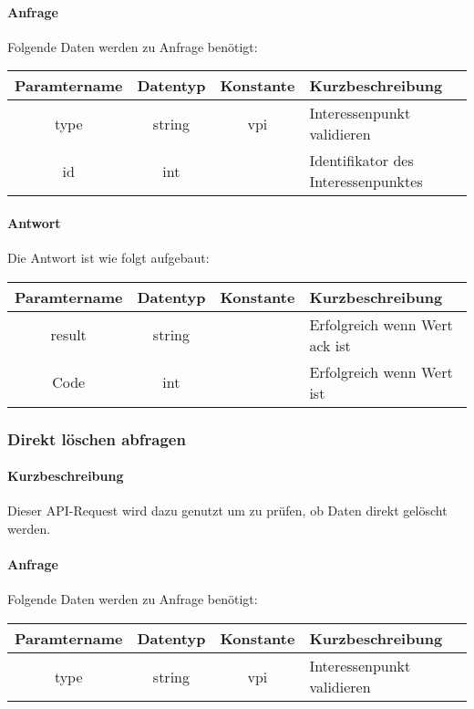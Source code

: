 \paragraph{Anfrage}Folgende Daten werden zu Anfrage benötigt:
\begin{table}[H]
	\begin{tabular}{|c|c|c|p{6.5cm}|}
		\hline
		\textbf{Paramtername} & \textbf{Datentyp} & \textbf{Konstante} & \textbf{Kurzbeschreibung}                                                                                               \\ \hline
		type                & string            & vpi                & Interessenpunkt validieren \\ \hline
		id                  & int               &                    & Identifikator des Interessenpunktes \\ \hline
	\end{tabular}
\end{table}
\paragraph{Antwort}Die Antwort ist wie folgt aufgebaut:
\begin{table}[H]
	\begin{tabular}{|c|c|c|p{6.5cm}|}
		\hline
		\textbf{Paramtername} & \textbf{Datentyp} & \textbf{Konstante} & \textbf{Kurzbeschreibung}                                                                                               \\ \hline
		result              & string           &                 & Erfolgreich wenn Wert {\glqq ack\grqq} ist \\ \hline
		Code                & int              &                 & Erfolgreich wenn Wert {\glqq 0\grqq} ist \\ \hline
	\end{tabular}
\end{table}
\subsubsection{Direkt löschen abfragen}
\paragraph{Kurzbeschreibung}Dieser API-Request wird dazu genutzt um zu prüfen, ob Daten direkt gelöscht werden.
\paragraph{Anfrage}Folgende Daten werden zu Anfrage benötigt:
\begin{table}[H]
	\begin{tabular}{|c|c|c|p{6.5cm}|}
		\hline
		\textbf{Paramtername} & \textbf{Datentyp} & \textbf{Konstante} & \textbf{Kurzbeschreibung}                                                                                               \\ \hline
		type                & string            & vpi                & Interessenpunkt validieren \\ \hline
	\end{tabular}
\end{table}
